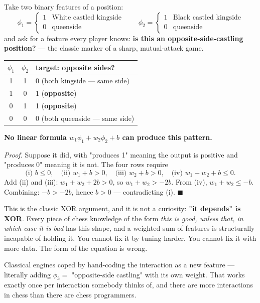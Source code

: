 Take two binary features of a position:
\[
  \phi_1 = \begin{cases}1 & \text{White castled kingside}\\ 0 & \text{queenside}\end{cases}
  \qquad
  \phi_2 = \begin{cases}1 & \text{Black castled kingside}\\ 0 & \text{queenside}\end{cases}
\]
and ask for a feature every player knows: \textbf{is this an opposite-side-castling
position?} --- the classic marker of a sharp, mutual-attack game.

\begin{center}
\begin{tabular}{@{}ccl@{}}
\toprule
$\phi_1$ & $\phi_2$ & target: opposite sides? \\
\midrule
1 & 1 & 0 (both kingside --- same side) \\
1 & 0 & 1 (\textbf{opposite}) \\
0 & 1 & 1 (\textbf{opposite}) \\
0 & 0 & 0 (both queenside --- same side) \\
\bottomrule
\end{tabular}
\end{center}

\begin{established}
\textbf{No linear formula $w_1\phi_1 + w_2\phi_2 + b$ can produce this pattern.}

\smallskip
\emph{Proof.} Suppose it did, with "produces 1" meaning the output is positive and "produces
0" meaning it is not. The four rows require
\[
\text{(i) } b \le 0,\quad
\text{(ii) } w_1 + b > 0,\quad
\text{(iii) } w_2 + b > 0,\quad
\text{(iv) } w_1 + w_2 + b \le 0 .
\]
Add (ii) and (iii): $w_1 + w_2 + 2b > 0$, so $w_1 + w_2 > -2b$. From (iv),
$w_1 + w_2 \le -b$. Combining: $-b > -2b$, hence $b > 0$ --- contradicting (i). $\blacksquare$
\end{established}

This is the classic XOR argument, and it is not a curiosity: \textbf{"it depends" is XOR}.
Every piece of chess knowledge of the form \emph{this is good, unless that, in which case it
is bad} has this shape, and a weighted sum of features is structurally incapable of holding
it. You cannot fix it by tuning harder. You cannot fix it with more data. The form of the
equation is wrong.

Classical engines coped by hand-coding the interaction as a new feature --- literally adding
$\phi_3 = $ "opposite-side castling" with its own weight. That works exactly once per
interaction somebody thinks of, and there are more interactions in chess than there are
chess programmers.


